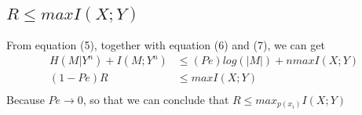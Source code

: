 \documentclass[a4paper, 12pt]{article}
\begin{document}
    \subsection{$R\le maxI(X;Y)$}
    From equation (5), together with equation (6) and (7), we can get
    \begin{equation}
        \begin{aligned}
            H(M|Y^n) + I(M;Y^n) &\le (Pe)log(|M|) + nmaxI(X;Y)\\
            (1-Pe)R &\le maxI(X;Y)\\
        \end{aligned}
    \end{equation}
    Because $Pe \rightarrow 0$, so that we can conclude that $R\le max_{p(x_i)}I(X;Y)$
\end{document}
